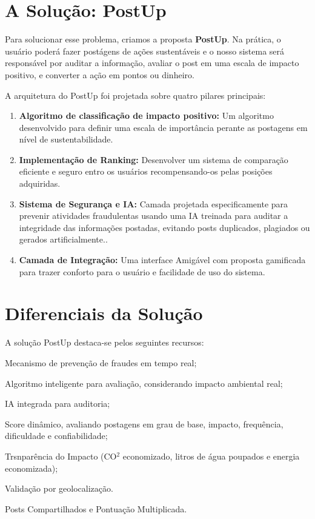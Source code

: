 \documentclass[
  12pt,
  a4paper,
  oneside,
  chapter=TITLE,
  section=TITLE,
  brazil
]{abntex2}
\begin{document}
\section{A Solução: PostUp}

Para solucionar esse problema, criamos a proposta \textbf{PostUp}. Na prática, o usuário poderá fazer postágens de ações sustentáveis e o nosso sistema será responsável por auditar a informação, avaliar o post em uma escala de impacto positivo, e converter a ação em pontos ou dinheiro.

A arquitetura do PostUp foi projetada sobre quatro pilares principais:
\begin{enumerate}
    \item \textbf{Algoritmo de classificação de impacto positivo:} Um algoritmo desenvolvido para definir uma escala de importância perante as postagens em nível de sustentabilidade.
    \item \textbf{Implementação de Ranking:} Desenvolver um sistema de comparação eficiente e seguro entro os usuários recompensando-os pelas posições adquiridas.
    \item \textbf{Sistema de Segurança e IA:} Camada projetada especificamente para prevenir atividades fraudulentas usando uma IA treinada para auditar a integridade das informações postadas, evitando posts duplicados, plagiados ou gerados artificialmente.. 
    \item \textbf{Camada de Integração:} Uma interface Amigável com proposta gamificada para trazer conforto para o usuário e facilidade de uso do sistema.
\end{enumerate}

\section{Diferenciais da Solução}

A solução PostUp destaca-se pelos seguintes recursos:

\begin{enumerate}[label={[\arabic*]}]
    \item Mecanismo de prevenção de fraudes em tempo real;
    \item Algoritmo inteligente para avaliação, considerando impacto ambiental real;
    \item IA integrada para auditoria;
    \item Score dinâmico, avaliando postagens em grau de base, impacto, frequência, dificuldade e confiabilidade;
    \item Trsnparência do Impacto (CO$^2$ economizado, litros de água poupados e energia economizada);
    \item Validação por geolocalização.
    \item Posts Compartilhados e Pontuação Multiplicada.
\end{enumerate}
\end{document}
